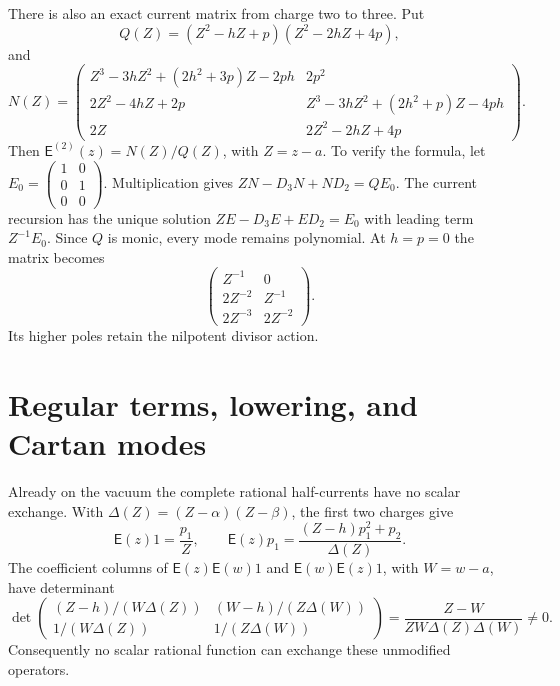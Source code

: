 There is also an exact current matrix from charge two to three.
Put
\[
 Q(Z)=(Z^2-hZ+p)(Z^2-2hZ+4p),
\]
and
\begin{equation}\label{cyrep:eq:charge-three-current}
 N(Z)=
 \begin{pmatrix}
 Z^3-3hZ^2+(2h^2+3p)Z-2ph&2p^2\\
 2Z^2-4hZ+2p&Z^3-3hZ^2+(2h^2+p)Z-4ph\\
 2Z&2Z^2-2hZ+4p
 \end{pmatrix}.
\end{equation}
Then \(\mathsf E^{(2)}(z)=N(Z)/Q(Z)\), with \(Z=z-a\).
To verify the formula, let
\(E_0=\left(\begin{smallmatrix}1&0\\0&1\\0&0\end{smallmatrix}\right)\).
Multiplication gives \(ZN-D_3N+ND_2=QE_0\).
The current recursion has the unique solution
\(ZE-D_3E+ED_2=E_0\) with leading term \(Z^{-1}E_0\).
Since \(Q\) is monic, every mode remains polynomial.
At \(h=p=0\) the matrix becomes
\[
 \begin{pmatrix}Z^{-1}&0\\2Z^{-2}&Z^{-1}\\
                       2Z^{-3}&2Z^{-2}\end{pmatrix}.
\]
Its higher poles retain the nilpotent divisor action.

\section{Regular terms, lowering, and Cartan modes}
\label{cyrep:sec:regular}

Already on the vacuum the complete rational half-currents
have no scalar exchange. With
\(\Delta(Z)=(Z-\alpha)(Z-\beta)\), the first two charges give
\[
 \mathsf E(z)1=\frac{p_1}{Z},\qquad
 \mathsf E(z)p_1=\frac{(Z-h)p_1^2+p_2}{\Delta(Z)}.
\]
The coefficient columns of
\(\mathsf E(z)\mathsf E(w)1\) and
\(\mathsf E(w)\mathsf E(z)1\), with \(W=w-a\), have determinant
\begin{equation}\label{cyrep:eq:scalar-defect}
 \det\begin{pmatrix}
 (Z-h)/(W\Delta(Z))&(W-h)/(Z\Delta(W))\\
 1/(W\Delta(Z))&1/(Z\Delta(W))
 \end{pmatrix}
 =\frac{Z-W}{ZW\Delta(Z)\Delta(W)}\ne0.
\end{equation}
Consequently no scalar rational function can exchange these
unmodified operators.

